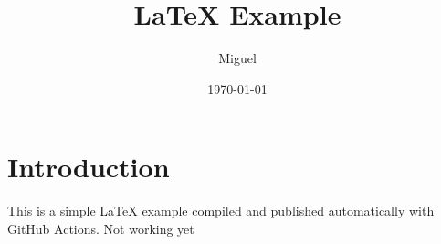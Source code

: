 \documentclass{article}
\title{LaTeX Example}
\author{Miguel}
\date{\today}
\begin{document}
\maketitle

\section{Introduction}

This is a simple \LaTeX{} example compiled and published automatically with GitHub Actions.
Not working yet
\end{document}
